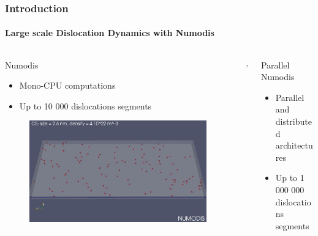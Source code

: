 \documentclass[aspectratio=1610,t,10pt]{beamer}
\newlength{\freeheight}
\begin{document}
\begin{frame}
    \frametitle{Introduction}
    \framesubtitle{Large scale Dislocation Dynamics with Numodis}
    \begin{columns}[c]
    \begin{column}{.44\textwidth}
        \begin{block}{Numodis}
            \begin{itemize}
                \item Mono-CPU computations
                \item Up to 10 000 dislocations segments
            \end{itemize}
       	\end{block}
	     \begin{figure}
	        	\centering
	        	\includegraphics[height=0.5\freeheight]{img/numo-example/numodis-1}
	     \end{figure}        
    \end{column}
	\begin{column}{.05\textwidth}
		\centering
		\textbf{\Large$\Rightarrow$}        
	\end{column}
    \begin{column}{.44\textwidth}
    	\begin{block}{Parallel Numodis}
    		\begin{itemize}
    			\item Parallel and distributed architectures
    			\item Up to 1 000 000 dislocations segments
    		\end{itemize}
    	\end{block}
    	\begin{figure}
    		\centering

\end{figure}
\end{column}
\end{columns}
\end{frame}
\end{document}
